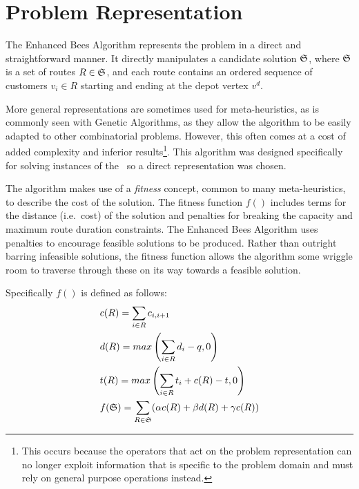 \section{Problem Representation}
\label{sec:problemrepresentation}

The Enhanced Bees Algorithm represents the problem in a direct and straightforward manner. It directly manipulates a candidate solution $\mathfrak{S}$, where $\mathfrak{S}$ is a set of routes $R \in \mathfrak{S}$, and each route contains an ordered sequence of customers $v_i \in R$ starting and ending at the depot vertex $v^d$.


More general representations are sometimes used for meta-heuristics, as is commonly seen with Genetic Algorithms, as they allow the algorithm to be easily adapted to other combinatorial problems. However, this often comes at a cost of added complexity and inferior results\footnote{This occurs because the operators that act on the problem representation can no longer exploit information that is specific to the problem domain and must rely on general purpose operations instead.}. This algorithm was designed specifically for solving instances of the \VRP\ so a direct representation was chosen.

The algorithm makes use of a \emph{fitness} concept, common to many meta-heuristics, to describe the cost of the solution. The fitness function $f()$ includes terms for the distance (i.e.~cost) of the solution and penalties for breaking the capacity and maximum route duration constraints. The Enhanced Bees Algorithm uses penalties to encourage feasible solutions to be produced. Rather than outright barring infeasible solutions, the fitness function allows the algorithm some wriggle room to traverse through these on its way towards a feasible solution.

Specifically $f()$ is defined as follows:
% 
\begin{align}
   & c(R) = \sum_{i \in R} c_{i, i+1} \\
   & d(R) = max\left( \sum_{i \in R} d_i - q, 0 \right)  \\
   & t(R) = max\left( \sum_{i \in R} t_i + c(R) - t, 0 \right)  \\
   & f(\mathfrak{S}) = \sum_{R \in \mathfrak{S}} (\alpha c(R) + \beta d(R) + \gamma c(R))
\end{align}

